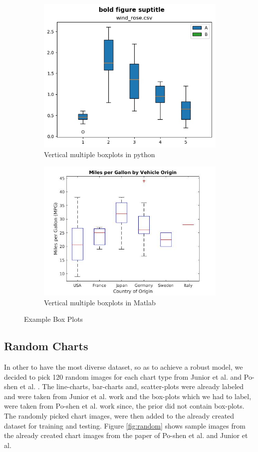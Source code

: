 \documentclass[12pt, a4paper,oneside]{report}
\begin{document}
\begin{figure}[!htbp]
	\begin{subfigure}{.5\textwidth}
		\centering
		\includegraphics[width=.8\linewidth]{box1}
		\caption{Vertical multiple boxplots in python}
		\label{fig:box1}
	\end{subfigure}%
	\begin{subfigure}{.5\textwidth}
		\centering
		\includegraphics[width=.8\linewidth]{box2}
		\caption{Vertical multiple boxplots in Matlab}
		\label{fig:box2}
	\end{subfigure}
	\caption{Example Box Plots}
	\label{fig:figbox}
\end{figure}


\subsection{Random Charts}
In other to have the most diverse dataset, so as to achieve a robust model, we decided to pick 120 random images for each chart type  from Junior et al. \cite{junior2017archi} and Po-shen et al. \cite{lee2016viziometrix}. The line-charts, bar-charts and, scatter-plots were already labeled and were taken from Junior et al. work and the box-plots which we had to label, were taken from Po-shen et al. work since, the prior did not contain box-plots. The randomly picked chart images, were then added to the already created dataset for training and testing. Figure \ref{fig:random} shows sample images from the already created chart images from the paper of Po-shen et al. and Junior et al.
\end{document}

